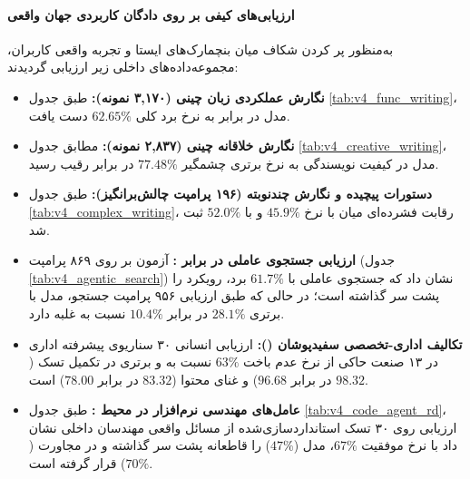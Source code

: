 \paragraph*{ارزیابی‌های کیفی بر روی دادگان کاربردی جهان واقعی}
به‌منظور پر کردن شکاف میان بنچمارک‌های ایستا و تجربه واقعی کاربران، مجموعه‌داده‌های داخلی زیر ارزیابی گردیدند:
\begin{itemize}
    \item \textbf{نگارش عملکردی زبان چینی (۳,۱۷۰ نمونه):} طبق جدول \ref{tab:v4_func_writing}، مدل در برابر  به نرخ برد کلی $62.65\%$ دست یافت.
    \item \textbf{نگارش خلاقانه چینی (۲,۸۳۷ نمونه):} مطابق جدول \ref{tab:v4_creative_writing}، مدل در کیفیت نویسندگی به نرخ برتری چشمگیر $77.48\%$ در برابر رقیب رسید.
    \item \textbf{دستورات پیچیده و نگارش چندنوبته (۱۹۶ پرامپت چالش‌برانگیز):} طبق جدول \ref{tab:v4_complex_writing}، رقابت فشرده‌ای میان  با نرخ $45.9\%$ و  با $52.0\%$ ثبت شد.
    \item \textbf{ارزیابی جستجوی عاملی در برابر :} آزمون بر روی ۸۶۹ پرامپت (جدول \ref{tab:v4_agentic_search}) نشان داد که جستجوی عاملی با $61.7\%$ برد، رویکرد  را پشت سر گذاشته است؛ در حالی که طبق ارزیابی ۹۵۶ پرامپت جستجو، مدل  با برتری $28.1\%$ در برابر $10.4\%$ نسبت به  غلبه دارد.
    \item \textbf{تکالیف اداری-تخصصی سفیدپوشان ():} ارزیابی انسانی ۳۰ سناریوی پیشرفته اداری در ۱۳ صنعت حاکی از نرخ عدم باخت $63\%$ نسبت به  و برتری در تکمیل تسک ($98.32$ در برابر $96.68$) و غنای محتوا ($83.32$ در برابر $78.00$) است.
    \item \textbf{عامل‌های مهندسی نرم‌افزار در محیط :} طبق جدول \ref{tab:v4_code_agent_rd}، ارزیابی روی ۳۰ تسک استانداردسازی‌شده از مسائل واقعی مهندسان داخلی نشان داد  با نرخ موفقیت $67\%$، مدل  ($47\%$) را قاطعانه پشت سر گذاشته و در مجاورت  ($70\%$) قرار گرفته است.
\end{itemize}

